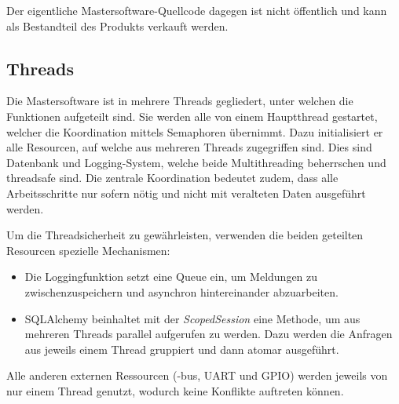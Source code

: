 Der eigentliche  Mastersoftware-Quellcode dagegen  ist nicht  \"offentlich und
kann als Bestandteil des Produkts verkauft werden.



\subsection{Threads}
\label{subsec:software:master:threads}


Die  Mastersoftware  ist in  mehrere  Threads  gegliedert, unter  welchen  die
Funktionen aufgeteilt  sind. Sie werden alle von  einem Hauptthread gestartet,
welcher die Koordination mittels Semaphoren \"ubernimmt. Dazu initialisiert er
alle  Resourcen,  auf  welche  aus  mehreren  Threads  zugegriffen  sind. Dies
sind  Datenbank und  Logging-System, welche  beide Multithreading  beherrschen
und  threadsafe  sind. Die zentrale  Koordination  bedeutet  zudem, dass  alle
Arbeitsschritte nur sofern n\"otig und nicht mit veralteten Daten ausgef\"uhrt
werden.

Um  die Threadsicherheit  zu  gew\"ahrleisten, verwenden  die beiden  geteilten
Resourcen spezielle Mechanismen:
\begin{itemize}
    \tightlist
    \item
        Die   Loggingfunktion  setzt   eine   Queue  ein,   um  Meldungen   zu
        zwischenzuspeichern und asynchron hintereinander abzuarbeiten.
     \item
        SQLAlchemy beinhaltet  mit der  \emph{ScopedSession} eine  Methode, um
        aus  mehreren  Threads  parallel  aufgerufen  zu  werden. Dazu  werden
        die  Anfragen  aus jeweils  einem  Thread  gruppiert und  dann  atomar
        ausgef\"uhrt.
 \end{itemize}

Alle anderen externen Ressourcen (\ISC-bus,  UART und GPIO) werden jeweils von
nur einem Thread genutzt, wodurch keine Konflikte auftreten k\"onnen.

